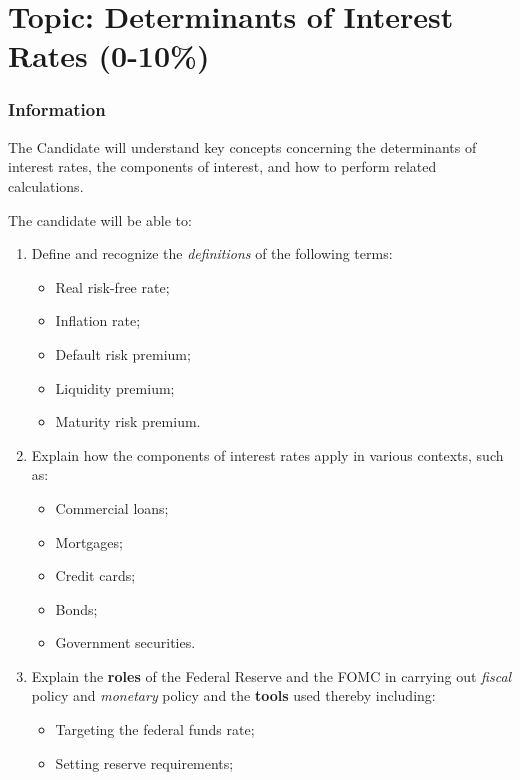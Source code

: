 \chapter[Topic: Determinants of Interest Rates]{Topic: Determinants of Interest Rates (0-10\%)}

\subsection{Information}

\begin{distributions}[Objective]
The Candidate will understand key concepts concerning the determinants of interest rates, the components of interest, and how to perform related calculations.
\end{distributions}

\begin{outcomes}
The candidate will be able to:
\begin{enumerate}[label = \alph*), leftmargin = *]
	\item	Define and recognize the \textit{definitions} of the following terms:
		\begin{itemize}[leftmargin = *]
		\item	Real risk-free rate;
		\item	Inflation rate;
		\item	Default risk premium;
		\item	Liquidity premium;
		\item	Maturity risk premium.
		\end{itemize}
	\item	Explain how the components of interest rates apply in various contexts, such as:
		\begin{itemize}[leftmargin = *]
		\item	Commercial loans;
		\item	Mortgages;
		\item	Credit cards;
		\item	Bonds;
		\item	Government securities.
		\end{itemize}
	\item	Explain the \textbf{roles} of the Federal Reserve and the FOMC in carrying out \textit{fiscal} policy and \textit{monetary} policy and the \textbf{tools} used thereby including:
		\begin{itemize}[leftmargin = *]
		\item	Targeting the federal funds rate;
		\item	Setting reserve requirements;

\end{itemize}
\end{enumerate}
\end{outcomes}
